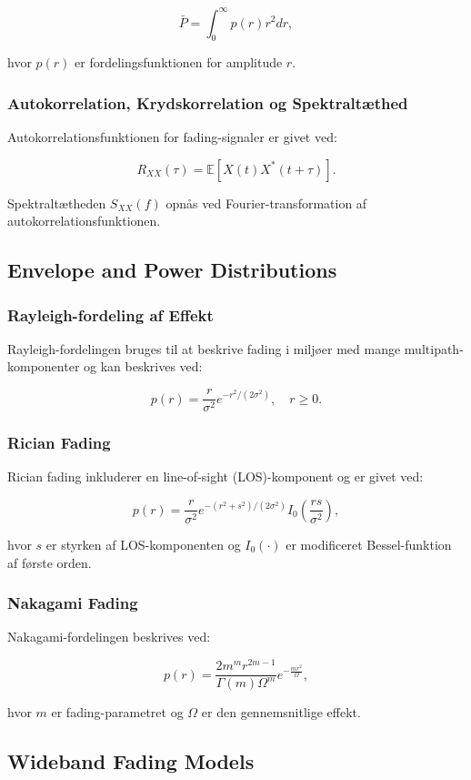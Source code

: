 \documentclass[a4paper,12pt]{book}
\begin{document}
	\[
	\bar{P} = \int_0^\infty p(r) r^2 dr,
	\]
	
	hvor \( p(r) \) er fordelingsfunktionen for amplitude \( r \).
	
	\subsubsection{Autokorrelation, Krydskorrelation og Spektraltæthed}
	Autokorrelationsfunktionen for fading-signaler er givet ved:
	
	\[
	R_{XX}(\tau) = \mathbb{E}[X(t) X^*(t + \tau)].
	\]
	
	Spektraltætheden \( S_{XX}(f) \) opnås ved Fourier-transformation af autokorrelationsfunktionen.
	
	\subsection{Envelope and Power Distributions}
	\subsubsection{Rayleigh-fordeling af Effekt}
	Rayleigh-fordelingen bruges til at beskrive fading i miljøer med mange multipath-komponenter og kan beskrives ved:
	
	\[
	p(r) = \frac{r}{\sigma^2} e^{-r^2 / (2 \sigma^2)}, \quad r \geq 0.
	\]
	
	\subsubsection{Rician Fading}
	Rician fading inkluderer en line-of-sight (LOS)-komponent og er givet ved:
	
	\[
	p(r) = \frac{r}{\sigma^2} e^{-(r^2 + s^2) / (2 \sigma^2)} I_0\left(\frac{r s}{\sigma^2}\right),
	\]
	
	hvor \( s \) er styrken af LOS-komponenten og \( I_0(\cdot) \) er modificeret Bessel-funktion af første orden.
	
	\subsubsection{Nakagami Fading}
	Nakagami-fordelingen beskrives ved:
	
	\[
	p(r) = \frac{2 m^m r^{2m-1}}{\Gamma(m) \Omega^m} e^{-\frac{m r^2}{\Omega}},
	\]
	
	hvor \( m \) er fading-parametret og \( \Omega \) er den gennemsnitlige effekt.
	
	\subsection{Wideband Fading Models}
\end{document}
